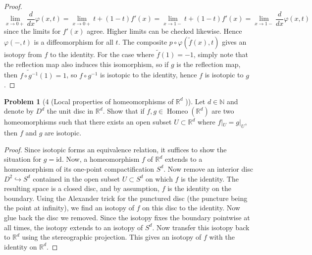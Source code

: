 \documentclass[reqno]{amsart}
\theoremstyle{definition}
\newtheorem{problem}[theorem]{Problem}
\theoremstyle{remark}
\DeclareMathOperator{\Homeo}{Homeo}
\newcommand{\id}{{\mathrm{id}}}
\begin{document}
\begin{proof}
\[         \lim_{x \to 0+} \frac{d}{dx}
         \varphi (x,t)
         = \lim_{x \to 0+} t + (1-t) f'(x)
         = \lim_{x \to 1-} t + (1-t) f'(x)
         = \lim_{x \to 1-} \frac{d}{dx}\varphi (x,t)
         \] 
         since the limits for
         $f'(x)$ agree.
         Higher limits can be checked likewise. 
         Hence $\varphi (-,t)$ is a diffeomorphism
         for all $t$. The composite
         $p \circ \varphi (\tilde{f}(x),t) $ gives
         an isotopy from
         $f$ to the identity.
         For the case where
         $\tilde{f}(1) = -1$, simply note that the
         reflection map also induces this isomorphism,
         so if $g$ is the reflection map,
         then $\tilde{f \circ g^{-1}}(1) = 1$, so
         $f \circ g^{-1} $ is isotopic to the identity,
         hence $f$ is isotopic to $g$.
         
         

        


 
    \end{proof}


    \begin{problem}[4 (Local properties of homeomorphisms
        of $\mathbb{R}^{d}$ )]
        Let $d \in \mathbb{N} $ and
        denote by $D^{d}$ the unit disc in
        $\mathbb{R}^{d}$. Show that if
        $f,g \in \Homeo \left( \mathbb{R}^{d} \right) $ are
        two homeomorphisms such that there exists
        an open subset $U \subset \mathbb{R}^{d}$ where
        $f|_{U} = g|_{U}$, then $f$ and $g$ are isotopic.
    \end{problem}

    \begin{proof}
        Since isotopic forms an equivalence relation, it
        suffices to show the situation for
        $g = \id$.
        Now, a homeomorphism  $f$ of $\mathbb{R}^{d}$ extends
        to a homeomorphism of its one-point compactification
        $S^{d}$. Now remove an interior disc
        $D^2 \hookrightarrow 
        S^{d}$ contained in the open subset $U 
        \subset S^{d}$ on which $f$ is the identity. The resulting
        space is a closed disc, and by assumption, $f$ is
        the identity on the boundary. Using the Alexander trick
        for the punctured disc (the puncture being the
        point at infinity),
        we find an isotopy of $f$ on this disc to the identity.
        Now glue back the disc we removed. Since the isotopy
        fixes the boundary pointwise at all times, the isotopy
        extends to an isotopy of $S^{d}$. Now transfer
        this isotopy back to $\mathbb{R}^{d}$ using the
        stereographic projection. This gives an isotopy of
        $f$ with the identity on $\mathbb{R}^{d}$.
    \end{proof}



\end{document}
